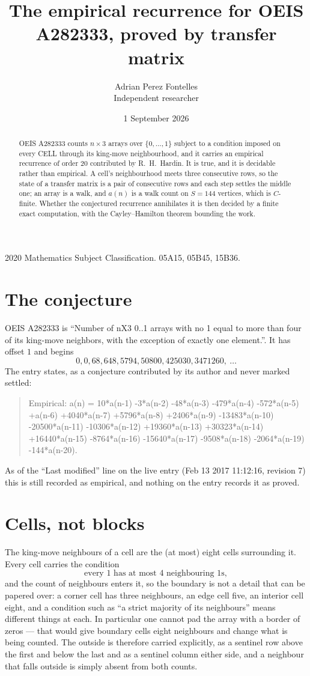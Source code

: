 \documentclass[11pt,a4paper]{article}
\title{The empirical recurrence for OEIS A282333, proved by transfer matrix}
\author{Adrian Perez Fontelles\\ \small Independent researcher}
\date{1 September 2026}
\theoremstyle{plain}
\theoremstyle{definition}
\begin{document}
\maketitle

\begin{abstract}
OEIS A282333 counts $n\times3$ arrays over $\{0,\dots,1\}$ subject to a condition imposed on
every CELL through its king-move neighbourhood, and it carries an empirical recurrence of
order $20$ contributed by R.~H.~Hardin. It is true, and it is decidable rather than
empirical. A cell's neighbourhood meets three consecutive rows, so the state of a transfer
matrix is a pair of consecutive rows and each step settles the middle one; an array is a
walk, and $a(n)$ is a walk count on $S=144$ vertices, which is $C$-finite. Whether the
conjectured recurrence annihilates it is then decided by a finite exact computation, with the
Cayley--Hamilton theorem bounding the work.
\end{abstract}

\noindent\small 2020 Mathematics Subject Classification. 05A15, 05B45, 15B36.\normalsize

\section{The conjecture}

OEIS A282333 is ``Number of nX3 0..1 arrays with no 1 equal to more than four of its king-move neighbors, with the exception of exactly one element.''. It has offset $1$ and begins
\[
0, 0, 68, 648, 5794, 50800, 425030, 3471260,\ \dots
\]
The entry states, as a conjecture contributed by its author and never marked settled:
\begin{quote}
Empirical: a(n) = 10*a(n-1) -3*a(n-2) -48*a(n-3) -479*a(n-4) -572*a(n-5) +a(n-6) +4040*a(n-7) +5796*a(n-8) +2406*a(n-9) -13483*a(n-10) -20500*a(n-11) -10306*a(n-12) +19360*a(n-13) +30323*a(n-14) +16440*a(n-15) -8764*a(n-16) -15640*a(n-17) -9508*a(n-18) -2064*a(n-19) -144*a(n-20).
\end{quote}
As of the ``Last modified'' line on the live entry (Feb 13 2017 11:12:16, revision 7) this is still
recorded as empirical, and nothing on the entry records it as proved.

\section{Cells, not blocks}

The king-move neighbours of a cell are the (at most) eight cells surrounding it. Every cell
carries the condition
\[
\text{every }1\text{ has at most }4\text{ neighbouring }1\text{s},
\]
and the count of neighbours enters it, so the boundary is not a detail that can be papered
over: a corner cell has three neighbours, an edge cell five, an interior cell eight, and a
condition such as ``a strict majority of its neighbours'' means different things at each. In
particular one cannot pad the array with a border of zeros --- that would give boundary cells
eight neighbours and change what is being counted. The outside is therefore carried
explicitly, as a sentinel row above the first and below the last and as a sentinel column
either side, and a neighbour that falls outside is simply absent from both counts.
\end{document}
